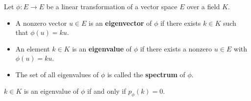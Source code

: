 Let $\phi : E \to E$ be a linear transformation of a vector space $E$ over a field $K$.
\begin{itemize}
\item A nonzero vector $u \in E$ is an \textbf{eigenvector} of $\phi$ if there exists $k \in K$ such that $\phi(u) = ku$.
\item An element $k \in K$ is an \textbf{eigenvalue} of $\phi$ if there exists a nonzero $u \in E$ with $\phi(u) = ku$.
\item The set of all eigenvalues of $\phi$ is called the \textbf{spectrum} of $\phi$.
\end{itemize}
$k \in K$ is an eigenvalue of $\phi$ if and only if $p_\phi(k) = 0$.
